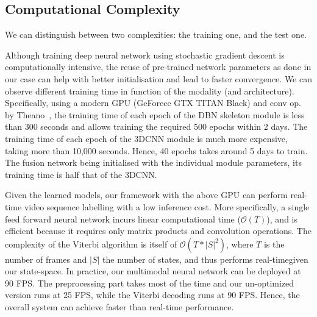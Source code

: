 \subsection{Computational Complexity}
\label{sec:ComputationalComplexity}

We can distinguish between two complexities: the training one, and the test one.

%
Although training deep neural network using stochastic gradient descent is computationally intensive,
the reuse of pre-trained network parameters as done in our case can help with  better initialisation and lead  to faster convergence.
%
We can observe different training time in function of the modality (and architecture).
%
Specifically, using a modern GPU (GeForece GTX TITAN Black) and conv op. by Theano~\cite{Bastien-Theano-2012},
the training time of each epoch of the DBN skeleton module is less than 300 seconds and allows training the required 500 epochs within 2 days.
%
The training time of each epoch of the 3DCNN \RGBD  module is much more  expensive,
taking more than 10,000 seconds.
Hence, 40 epochs takes around 5 days to train.
%
The fusion network being initialised with the individual module parameters, its training time is half that of the 3DCNN.


%
Given the learned models, our framework with the above GPU can perform real-time video sequence labelling with a low inference cost.
%
More specifically, a single feed forward neural network incurs linear computational time ($\mathcal{O}(T)$),
and is efficient because it requires only matrix products and convolution operations.
The complexity of the Viterbi algorithm is itself of $\mathcal{O} (T* |S|^2)$, where
$T$ is the number of frames and $|S|$ the number of states, and thus performs real-timegiven our state-space.
In practice, our multimodal neural network can be deployed at 90 FPS.
The preprocessing part takes most of the time and our un-optimized version runs at 25 FPS, while the
 Viterbi decoding  runs at 90 FPS. Hence, the overall system can achieve faster than real-time performance.


\endinput
